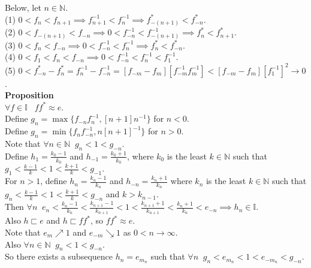 \documentclass{article}
\newcommand{\nat}{ \mathbb{N}}
\newcommand{\zeqs}{ \mathbb{I}}
\newcommand{\forks}{ \sqsubset}
\begin{document}
Below, let $n \in \nat$.\\

(1) $0 < f_n < f_{n+1} \implies f_{n+1}^{-1} < f_{n}^{-1}  \implies f_{-(n+1)}^* < f_{-n}^*$.\\

(2) $0 < f_{-(n+1)} < f_{-n}   \implies 0 < f_{-n}^{-1} < f_{-(n+1)}^{-1}   \implies f_{n}^* < f_{n+1}^*$.\\

(3) $0 < f_n < f_{-n} \implies 0 < f_{-n}^{-1} < f_n^{-1} \implies f_{n}^* < f_{-n}^*$.\\

(4) $0 < f_1 < f_n < f_{-n} \implies 0 < f_{-n}^{-1} < f_n^{-1} < f_1^{-1}$.\\

(5) $0 < f_{-n}^* - f_n^* = f_n^{-1} - f_{-n}^{-1} = [f_{-m} - f_{m}][f_{-m}^{-1}f_{m}^{-1}] < [f_{-m} - f_{m}][f_{1}^{-1}]^2 \to 0$.\\

\textbf{Proposition}\\
$\forall f \in \zeqs \;\;\; ff^* \approx e$.\\

Define $g_n = \max\{f_{-n}f_n^{-1}, [n + 1]n^{-1} \}$ for $n < 0$.\\

Define $g_n = \min\{f_{n}f_{-n}^{-1}, n[n + 1]^{-1} \}$ for $n > 0$.\\

Note that $\forall n \in \nat \;\; g_n < 1 < g_{-n}$.\\

Define $h_1 = \frac{k_0-1}{k_0}$ and $h_{-1} = \frac{k_0+1}{k_0}$, where $k_0$ is the least $k \in \nat$ such that $g_1 < \frac{k-1}{k} < 1 < \frac{k+1}{k} < g_{-1}.$\\

For $n > 1$, define $h_n = \frac{k_n-1}{k_n}$ and $h_{-n} = \frac{k_n+1}{k_n}$ where $k_n$ is the least $k \in \nat$ such that $g_n < \frac{k-1}{k} < 1 < \frac{k+1}{k}< g_{-n}$ and $k > k_{n-1}$.\\

Then $\forall n \;\; e_n < \frac{k_n-1}{k_n} < \frac{k_{n+1}-1}{k_{n+1}} < 1 < \frac{k_{n+1}+1}{k_{n+1}} < \frac{k_n+1}{k_n} < e_{-n} \implies h_n \in \zeqs$.\\

Also $h \forks e$ and $h \forks ff^*$, so $ff^* \approx e$.\\

Note that $e_m \nearrow 1$ and $e_{-m} \searrow 1$ as $0< n \to \infty.$\\

Also $\forall n \in \nat \;\; g_n < 1 < g_{-n}$.\\

So there exists a subsequence $h_n = e_{m_n}$ such that $\forall n \;\; g_n < e_{m_n} < 1 < e_{-m_n} < g_{-n}$.\\
\end{document}
